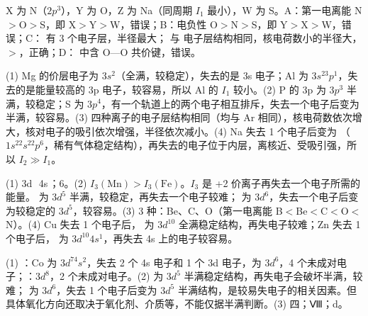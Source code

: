 \begin{jiexilist}
\item {}X 为 N（$2p^3$），Y 为 O，Z 为 Na（同周期 $I_1$ 最小），W 为 S。A：第一电离能 N$>$O$>$S，即 X$>$Y$>$W，错误；B：电负性 O$>$N$>$S，即 Y$>$X$>$W，错误；C： 有 3 个电子层，半径最大； 与  电子层结构相同，核电荷数小的半径大，$>$，正确；D： 中含 O—O 共价键，错误。
\item (1) Mg 的价层电子为 $3s^2$（全满，较稳定），失去的是 3s 电子；Al 为 $3s^23p^1$，失去的是能量较高的 3p 电子，较容易，所以 Al 的 $I_1$ 较小。(2) P 的 3p 为 $3p^3$ 半满，较稳定；S 为 $3p^4$，有一个轨道上的两个电子相互排斥，失去一个电子后变为半满，较容易。(3) 四种离子的电子层结构相同（均与 Ar 相同），核电荷数依次增大，核对电子的吸引依次增强，半径依次减小。(4) Na 失去 1 个电子后变为 （$1s^22s^22p^6$，稀有气体稳定结构），再失去的电子位于内层，离核近、受吸引强，所以 $I_2\gg I_1$。
\item (1) 3d\,\ 4s\,；6。(2) $I_3(\text{Mn})>I_3(\text{Fe})$。$I_3$ 是 +2 价离子再失去一个电子所需的能量。 为 $3d^5$ 半满，较稳定，再失去一个电子较难； 为 $3d^6$，失去一个电子后变为较稳定的 $3d^5$，较容易。(3) 3 种：Be、C、O（第一电离能 B$<$Be$<$C$<$O$<$N）。(4) Cu 失去 1 个电子后， 为 $3d^{10}$ 全满稳定结构，再失电子较难；Zn 失去 1 个电子后， 为 $3d^{10}4s^1$，再失去 4s 上的电子较容易。
\item (1) ：Co 为 $3d^74s^2$，失去 2 个 4s 电子和 1 个 3d 电子，为 $3d^6$，4 个未成对电子；：$3d^8$，2 个未成对电子。(2)  为 $3d^5$ 半满稳定结构，再失电子会破坏半满，较难； 为 $3d^6$，失去 1 个电子后变为 $3d^5$ 半满结构，是较易失电子的相关因素。但具体氧化方向还取决于氧化剂、介质等，不能仅据半满判断。(3) 四；Ⅷ；d。
\end{jiexilist}
